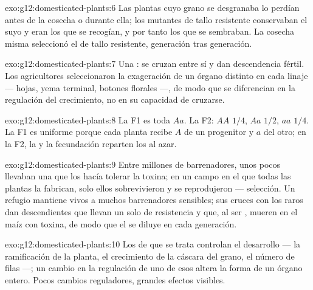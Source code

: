 \begin{solution}{exo:g12:domesticated-plants:6}
Las plantas cuyo grano se desgranaba lo perdían antes de la cosecha o
durante ella; los mutantes de tallo resistente conservaban el suyo y
eran los que se recogían, y por tanto los que se sembraban. La cosecha
misma seleccionó el  de tallo resistente, generación tras
generación.
\end{solution}

\begin{solution}{exo:g12:domesticated-plants:7}
Una : se cruzan entre sí y dan descendencia fértil. Los
agricultores seleccionaron la exageración de un órgano distinto en cada
linaje --- hojas, yema terminal, botones florales ---, de modo que se
diferencian en la regulación del crecimiento, no en su capacidad de
cruzarse.
\end{solution}

\begin{solution}{exo:g12:domesticated-plants:8}
La F1 es toda $Aa$. La F2: $AA$ $1/4$, $Aa$ $1/2$, $aa$ $1/4$. La F1 es
uniforme porque cada planta recibe $A$ de un progenitor y $a$ del otro;
en la F2, la  y la fecundación reparten los  al azar.
\end{solution}

\begin{solution}{exo:g12:domesticated-plants:9}
Entre millones de barrenadores, unos pocos llevaban una  que
los hacía tolerar la toxina; en un campo en el que todas las plantas la
fabrican, solo ellos sobrevivieron y se reprodujeron --- selección. Un
refugio mantiene vivos a muchos barrenadores sensibles; sus cruces con
los raros  dan descendientes que llevan un solo  de
resistencia y que, al ser , mueren en el maíz con toxina, de
modo que el  se diluye en cada generación.
\end{solution}

\begin{solution}{exo:g12:domesticated-plants:10}
Los  de que se trata controlan el desarrollo --- la ramificación
de la planta, el crecimiento de la cáscara del grano, el número de
filas ---; un cambio en la regulación de uno de esos  altera la
forma de un órgano entero. Pocos cambios reguladores, grandes efectos
visibles.
\end{solution}

